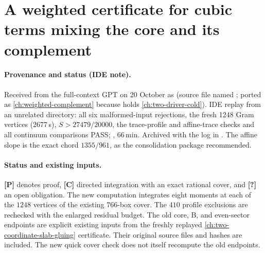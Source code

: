 \section{A weighted certificate for cubic terms mixing the core and its complement}
\label{ch:weighted-complement}

\paragraph{Provenance and status (IDE note).} Received from the full-context GPT on 20 October as 
(source file named ; ported as \autoref{ch:weighted-complement} because  holds \autoref{ch:two-driver-cold}). IDE replay
 from an unrelated directory: all six malformed-input rejections, the fresh 1248 Gram vertices (2677\,s), $S>27479/20000$,
the trace-profile and affine-trace checks and all continuum comparisons PASS; , 66\,min. Archived with the log in
. The affine slope is the exact chord $1355/961$, as the consolidation package recommended.

\paragraph{Status and existing inputs.}
\textbf{[P]} denotes proof, \textbf{[C]} directed integration with an
exact rational cover, and \textbf{[?]} an open obligation.
The new computation integrates eight moments at each of the \(1248\)
vertices of the existing \(766\)-box cover. The \(410\) profile
exclusions are rechecked with the enlarged residual budget.
The old core, B, and even-sector endpoints are explicit existing
inputs from the freshly replayed \autoref{ch:two-coordinate-slab-gluing} certificate.
Their original source files and hashes are included.
The new quick cover check does not itself recompute the old endpoints.

